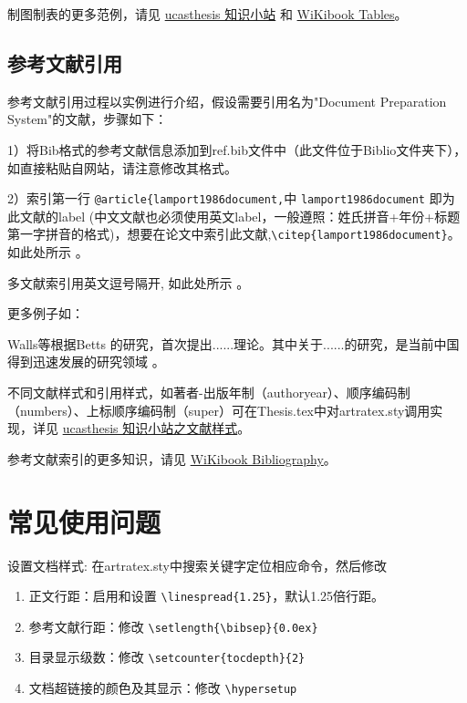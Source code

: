 制图制表的更多范例，请见 \href{https://github.com/mohuangrui/ucasthesis/wiki}{ucasthesis 知识小站} 和 \href{https://en.wikibooks.org/wiki/LaTeX/Tables}{WiKibook Tables}。

\subsection{参考文献引用}

参考文献引用过程以实例进行介绍，假设需要引用名为"Document Preparation System"的文献，步骤如下：

1）将Bib格式的参考文献信息添加到ref.bib文件中（此文件位于Biblio文件夹下），如直接粘贴自网站，请注意修改其格式。

2）索引第一行 \verb|@article{lamport1986document,|中 \verb|lamport1986document| 即为此文献的label (中文文献也必须使用英文label，一般遵照：姓氏拼音+年份+标题第一字拼音的格式)，想要在论文中索引此文献,\verb|\citep{lamport1986document}|。如此处所示 \citep{lamport1986document}。

多文献索引用英文逗号隔开, 如此处所示 \citep{lamport1986document, chu2004tushu, chen2005zhulu}。

更多例子如：

Walls等\citep{walls2013drought}根据Betts\citep{betts2005aging} 的研究，首次提出......理论。其中关于......的研究\citep{walls2013drought, betts2005aging}，是当前中国得到迅速发展的研究领域 \citep{chen1980zhongguo, bravo1990comparative}。

不同文献样式和引用样式，如著者-出版年制（authoryear）、顺序编码制（numbers）、上标顺序编码制（super）可在Thesis.tex中对artratex.sty调用实现，详见 \href{https://github.com/mohuangrui/ucasthesis/wiki}{ucasthesis 知识小站之文献样式}。


参考文献索引的更多知识，请见 \href{https://en.wikibooks.org/wiki/LaTeX/Bibliography_Management}{WiKibook Bibliography}。\nocite{*}%

\section{常见使用问题}\label{sec:qa}

设置文档样式: 在artratex.sty中搜索关键字定位相应命令，然后修改
\begin{enumerate}
    \item 正文行距：启用和设置 \verb|\linespread{1.25}|，默认1.25倍行距。
    \item 参考文献行距：修改 \verb|\setlength{\bibsep}{0.0ex}|
    \item 目录显示级数：修改 \verb|\setcounter{tocdepth}{2}|
    \item 文档超链接的颜色及其显示：修改 \verb|\hypersetup|
\end{enumerate}

